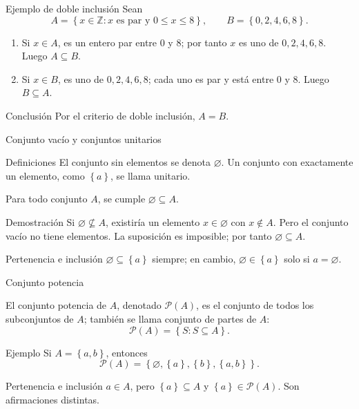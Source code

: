 \documentclass[aspectratio=169,11pt]{beamer}
\newcommand{\ZZ}{\mathbb{Z}}
\newcommand{\PP}{\mathcal{P}}
\newcommand{\Set}[1]{\left\{#1\right\}}
\begin{document}
\begin{frame}{Ejemplo de doble inclusión}
    Sean
    \[
      A=\Set{x\in\ZZ:x\text{ es par y }0\leq x\leq 8},\qquad
      B=\Set{0,2,4,6,8}.
    \]
    \begin{enumerate}
        \item Si $x\in A$, es un entero par entre $0$ y $8$; por tanto $x$ es uno de $0,2,4,6,8$. Luego $A\subseteq B$.
        \item Si $x\in B$, es uno de $0,2,4,6,8$; cada uno es par y está entre $0$ y $8$. Luego $B\subseteq A$.
    \end{enumerate}
    \begin{exampleblock}{Conclusión}
        Por el criterio de doble inclusión, $A=B$.
    \end{exampleblock}

\end{frame}

\begin{frame}{Conjunto vacío y conjuntos unitarios}
    \begin{block}{Definiciones}
        El conjunto sin elementos se denota $\varnothing$. Un conjunto con exactamente un elemento, como $\Set{a}$, se llama unitario.
    \end{block}
    \begin{theorem}
        Para todo conjunto $A$, se cumple $\varnothing\subseteq A$.
    \end{theorem}
    \begin{block}{Demostración}
        Si $\varnothing\nsubseteq A$, existiría un elemento $x\in\varnothing$ con $x\notin A$. Pero el conjunto vacío no tiene elementos. La suposición es imposible; por tanto $\varnothing\subseteq A$.
    \end{block}
    \begin{exampleblock}{Pertenencia e inclusión}
        $\varnothing\subseteq\Set{a}$ siempre; en cambio, $\varnothing\in\Set{a}$ solo si $a=\varnothing$.
    \end{exampleblock}
\end{frame}

\begin{frame}{Conjunto potencia}
    \begin{definition}
        El conjunto potencia de $A$, denotado $\PP(A)$, es el conjunto de todos los subconjuntos de $A$; también se llama conjunto de partes de $A$:
        \[
          \PP(A)=\Set{S:S\subseteq A}.
        \]
    \end{definition}
    \begin{exampleblock}{Ejemplo}
        Si $A=\Set{a,b}$, entonces
        \[
          \PP(A)=\Set{\varnothing,\Set{a},\Set{b},\Set{a,b}}.
        \]
    \end{exampleblock}
    \begin{alertblock}{Pertenencia e inclusión}
        $a\in A$, pero $\Set{a}\subseteq A$ y $\Set{a}\in\PP(A)$. Son afirmaciones distintas.
    \end{alertblock}
\end{frame}
\end{document}

